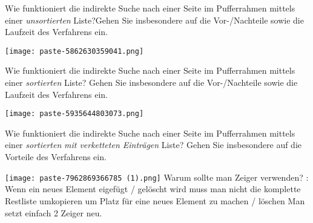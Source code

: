 \documentclass{article}
\begin{document}
\begin{tcolorbox}[colback=white!10!white,colframe=lightgray!75!black,
  savelowerto=\jobname_ex.tex,breakable,enhanced,lines before break=50]

\begin{center}
 Wie funktioniert die indirekte Suche nach einer Seite im Pufferrahmen mittels einer 
\textit{unsortierten
} Liste?Gehen Sie insbesondere auf die Vor-/Nachteile sowie die Laufzeit des Verfahrens ein. 

\end{center}

\tcblower

\justifying
\texttt{[image: paste-5862630359041.png]}

\end{tcolorbox}
\begin{tcolorbox}[colback=white!10!white,colframe=lightgray!75!black,
  savelowerto=\jobname_ex.tex,breakable,enhanced,lines before break=50]

\begin{center}
 Wie funktioniert die indirekte Suche nach einer Seite im Pufferrahmen mittels einer
\textit{sortierten
} Liste? Gehen Sie insbesondere auf die Vor-/Nachteile sowie die Laufzeit des Verfahrens ein. 

\end{center}

\tcblower

\justifying
\texttt{[image: paste-5935644803073.png]}

\end{tcolorbox}
\begin{tcolorbox}[colback=white!10!white,colframe=lightgray!75!black,
  savelowerto=\jobname_ex.tex,breakable,enhanced,lines before break=50]

\begin{center}
 Wie funktioniert die indirekte Suche nach einer Seite im Pufferrahmen mittels einer
\textit{sortierten
}\textit{mit verketteten Einträgen
}Liste? Gehen Sie insbesondere auf die Vorteile des Verfahrens ein. 

\end{center}

\tcblower

\justifying
\texttt{[image: paste-7962869366785 (1).png]}
Warum sollte man Zeiger verwenden?
:
Wenn ein neues Element eigefügt / gelöscht wird muss man nicht die komplette Restliste umkopieren um Platz für eine neues Element zu machen / löschen  Man setzt einfach 2 Zeiger neu.

\end{tcolorbox}
\end{document}
